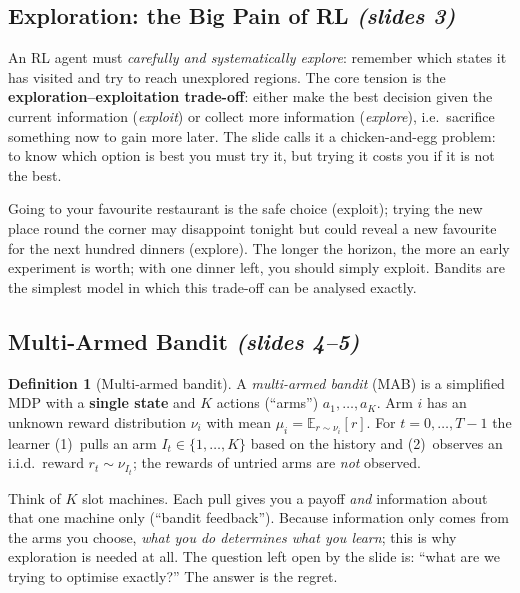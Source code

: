 \documentclass[11pt,a4paper]{article}
\newcommand{\E}{\mathbb{E}}
\newcommand{\slides}[1]{\emph{(slides #1)}}
\theoremstyle{plain}
\theoremstyle{definition}
\newtheorem{definition}[theorem]{Definition}
\theoremstyle{remark}
\begin{document}
\subsection{Exploration: the Big Pain of RL \slides{3}}

An RL agent must \emph{carefully and systematically explore}: remember which states it has visited and try to
reach unexplored regions. The core tension is the \textbf{exploration--exploitation trade-off}: either make the
best decision given the current information (\emph{exploit}) or collect more information (\emph{explore}),
i.e.\ sacrifice something now to gain more later. The slide calls it a chicken-and-egg problem: to know which
option is best you must try it, but trying it costs you if it is not the best.

\begin{intuition}
Going to your favourite restaurant is the safe choice (exploit); trying the new place round the corner may
disappoint tonight but could reveal a new favourite for the next hundred dinners (explore). The longer the
horizon, the more an early experiment is worth; with one dinner left, you should simply exploit. Bandits are
the simplest model in which this trade-off can be analysed exactly.
\end{intuition}

\subsection{Multi-Armed Bandit \slides{4--5}}

\begin{definition}[Multi-armed bandit]
A \emph{multi-armed bandit} (MAB) is a simplified MDP with a \textbf{single state} and $K$ actions (``arms'')
$a_1,\dots,a_K$. Arm $i$ has an unknown reward distribution $\nu_i$ with mean $\mu_i=\E_{r\sim\nu_i}[r]$.
For $t=0,\dots,T-1$ the learner (1)~pulls an arm $I_t\in\{1,\dots,K\}$ based on the history and (2)~observes an
i.i.d.\ reward $r_t\sim\nu_{I_t}$; the rewards of untried arms are \emph{not} observed.
\end{definition}

\begin{intuition}
Think of $K$ slot machines. Each pull gives you a payoff \emph{and} information about that one machine only
(``bandit feedback''). Because information only comes from the arms you choose, \emph{what you do determines
what you learn}; this is why exploration is needed at all. The question left open by the slide is: ``what are we
trying to optimise exactly?'' The answer is the regret.
\end{intuition}
\end{document}
